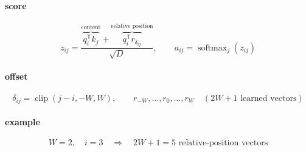 \documentclass{article}
\begin{document}
\paragraph{score}
\[
z_{ij}=\frac{\overbrace{q_i^{\mathsf T}k_j}^{\text{content}}+\overbrace{q_i^{\mathsf T}r_{\delta_{ij}}}^{\text{relative position}}}{\sqrt{D}},\qquad a_{ij}=\operatorname{softmax}_{j}(z_{ij})
\]

\paragraph{offset}
\[
\delta_{ij}=\operatorname{clip}(j-i,-W,W),\qquad r_{-W},\ldots,r_0,\ldots,r_W\quad(2W+1\text{ learned vectors})
\]

\paragraph{example}
\[
W=2,\quad i=3\quad\Longrightarrow\quad 2W+1=5\text{ relative-position vectors}
\]
\end{document}
